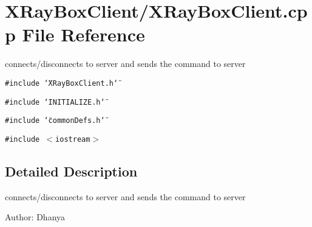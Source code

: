 \section{XRay\-Box\-Client/XRay\-Box\-Client.cpp File Reference}
\label{XRayBoxClient_8cpp}
connects/disconnects to server and sends the command to server 

{\tt \#include \char`\"{}XRay\-Box\-Client.h\char`\"{}}\par
{\tt \#include \char`\"{}INITIALIZE.h\char`\"{}}\par
{\tt \#include \char`\"{}common\-Defs.h\char`\"{}}\par
{\tt \#include $<$iostream$>$}\par


\subsection{Detailed Description}
connects/disconnects to server and sends the command to server 

\begin{Desc}
\item[Author:]Dhanya \end{Desc}

